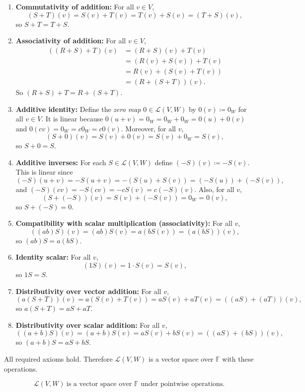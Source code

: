 \documentclass[12pt]{article}
\newcommand{\F}{\mathbb{F}}
\newcommand{\cL}{\mathcal{L}}
\begin{document}
\begin{enumerate}[label=\textbf{(A\arabic*)}, leftmargin=*]
\item \textbf{Commutativity of addition:} For all $v\in V$,
\[
(S+T)(v)=S(v)+T(v)=T(v)+S(v)=(T+S)(v),
\]
so $S+T=T+S$.

\item \textbf{Associativity of addition:} For all $v\in V$,
\begin{align*}
((R+S)+T)(v)
&=(R+S)(v)+T(v)\\
&=(R(v)+S(v))+T(v)\\
&=R(v)+(S(v)+T(v))\\
&=(R+(S+T))(v).
\end{align*}
So $(R+S)+T=R+(S+T)$.

\item \textbf{Additive identity:} Define the \emph{zero map} $0\in\cL(V,W)$ by $0(v)\coloneqq 0_W$ for all $v\in V$.
It is linear because $0(u+v)=0_W=0_W+0_W=0(u)+0(v)$ and $0(cv)=0_W=c0_W=c0(v)$.
Moreover, for all $v$,
\[
(S+0)(v)=S(v)+0(v)=S(v)+0_W=S(v),
\]
so $S+0=S$.

\item \textbf{Additive inverses:} For each $S\in\cL(V,W)$ define $(-S)(v)\coloneqq -S(v)$.
This is linear since
\[
(-S)(u+v)=-S(u+v)=-(S(u)+S(v))=(-S(u))+(-S(v)),
\]
and $(-S)(cv)=-S(cv)=-cS(v)=c(-S)(v)$.
Also, for all $v$,
\[
(S+(-S))(v)=S(v)+(-S(v))=0_W=0(v),
\]
so $S+(-S)=0$.

\item \textbf{Compatibility with scalar multiplication (associativity):} For all $v$,
\[
((ab)S)(v)=(ab)S(v)=a(bS(v))=(a(bS))(v),
\]
so $(ab)S=a(bS)$.

\item \textbf{Identity scalar:} For all $v$,
\[
(1S)(v)=1\cdot S(v)=S(v),
\]
so $1S=S$.

\item \textbf{Distributivity over vector addition:} For all $v$,
\[
(a(S+T))(v)=a(S(v)+T(v))=aS(v)+aT(v)=((aS)+(aT))(v),
\]
so $a(S+T)=aS+aT$.

\item \textbf{Distributivity over scalar addition:} For all $v$,
\[
((a+b)S)(v)=(a+b)S(v)=aS(v)+bS(v)=((aS)+(bS))(v),
\]
so $(a+b)S=aS+bS$.
\end{enumerate}

All required axioms hold. Therefore $\cL(V,W)$ is a vector space over $\F$ with these operations.

\[
\boxed{\,\cL(V,W)\ \text{is a vector space over }\F\text{ under pointwise operations.}\,}
\]
\end{document}

